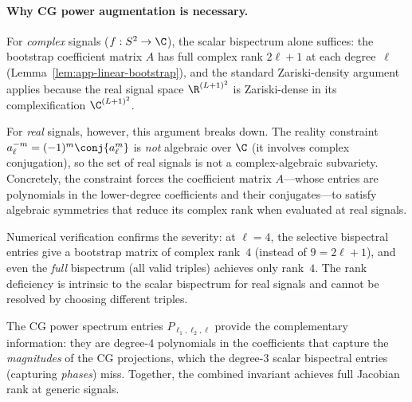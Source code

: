 
\paragraph{Why CG power augmentation is necessary.}
For \emph{complex} signals ($f : S^2 \to \C$), the scalar bispectrum
alone suffices: the bootstrap coefficient matrix $A$ has full complex
rank $2\ell{+}1$ at each degree~$\ell$ (Lemma~\ref{lem:app-linear-bootstrap}),
and the standard Zariski-density argument applies because the real
signal space $\R^{(L+1)^2}$ is Zariski-dense in its complexification
$\C^{(L+1)^2}$.

For \emph{real} signals, however, this argument breaks down. The
reality constraint $a_\ell^{-m} = (-1)^m \conj{a_\ell^m}$ is
\emph{not} algebraic over $\C$ (it involves complex conjugation), so
the set of real signals is not a complex-algebraic subvariety.
Concretely, the constraint forces the coefficient matrix $A$---whose
entries are polynomials in the lower-degree coefficients and their
conjugates---to satisfy algebraic symmetries that reduce its complex
rank when evaluated at real signals.

Numerical verification confirms the severity: at $\ell = 4$, the
selective bispectral entries give a bootstrap matrix of complex
rank~$4$ (instead of $9 = 2\ell{+}1$), and even the \emph{full}
bispectrum (all valid triples) achieves only rank~$4$. The rank
deficiency is intrinsic to the scalar bispectrum for real signals
and cannot be resolved by choosing different triples.

The CG power spectrum entries $P_{\ell_1,\ell_2,\ell}$ provide the
complementary information: they are degree-$4$ polynomials in the
coefficients that capture the \emph{magnitudes} of the CG projections,
which the degree-$3$ scalar bispectral entries (capturing
\emph{phases}) miss. Together, the combined invariant achieves full
Jacobian rank at generic signals.



